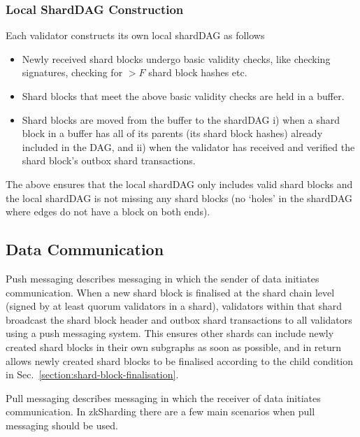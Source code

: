 \subsubsection{Local ShardDAG Construction}
Each validator constructs its own local shardDAG as follows
\begin{itemize}
	\item Newly received shard blocks undergo basic validity checks, like checking signatures, checking for $>F$ shard block hashes etc.
	\item Shard blocks that meet the above basic validity checks are held in a buffer.
	\item Shard blocks are moved from the buffer to the shardDAG i) when a shard block in a buffer has all of its parents (its shard block hashes) already included in the DAG, and ii) when the validator has received and verified the shard block's outbox shard transactions.	
\end{itemize} 
The above ensures that the local shardDAG only includes valid shard blocks and the local shardDAG is not missing any shard blocks (no `holes' in the shardDAG where edges do not have a block on both ends).



\subsection{Data Communication}
Push messaging describes messaging in which the sender of data initiates communication. 
When a new shard block is finalised at the shard chain level (signed by at least quorum validators in a shard), validators within that shard broadcast the shard block header and outbox shard transactions to all validators using a push messaging system. This ensures other shards can include newly created shard blocks in their own subgraphs as soon as possible, and in return allows newly created shard blocks to be finalised according to the child condition in Sec.~\ref{section:shard-block-finalisation}.

Pull messaging describes messaging in which the receiver of data initiates communication. In zkSharding there are a few main scenarios when pull messaging should be used.

